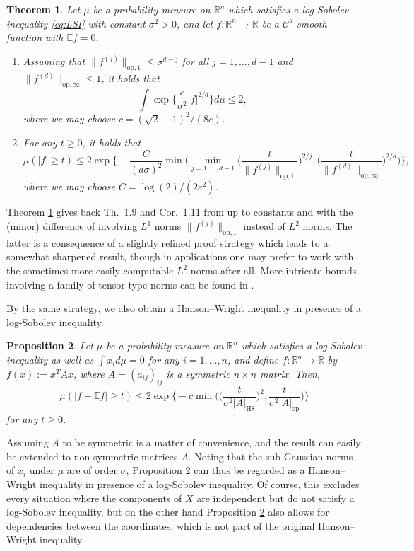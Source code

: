 \documentclass[a4paper,12pt]{amsart}
\numberwithin{equation}{section}
\newtheorem{satz}{Theorem}[section]
\newtheorem{proposition}[satz]{Proposition}
\theoremstyle{remark}
\def\E{{\mathbb E}}
\def\R{{\mathbb R}}
\begin{document}
\begin{satz}\label{thm:HigherOrderLSI}
	Let $\mu$ be a probability measure on $\R^n$ which satisfies a log-Sobolev inequality \eqref{eq:LSI} with constant $\sigma^2 > 0$, and let $f\colon \R^n \to \R$ be a $\mathcal{C}^d$-smooth function with $\E f = 0$.
	\begin{enumerate}
		\item Assuming that $\lVert f^{(j)} \rVert_{\mathrm{op},1} \le \sigma^{d-j}$ for all $j=1,\ldots,d-1$ and $\lVert f^{(d)} \rVert_{\mathrm{op},\infty} \le 1$, it holds that
		\[
		\int \exp\Big\{\frac{c}{\sigma^2} |f|^{2/d} \Big\} d\mu \le 2,
		\]
		where we may choose $c=(\sqrt{2}-1)^2/(8e)$.
		\item For any $t\ge 0$, it holds that
		\[
		\mu(|f| \ge t)\le
		2 \exp\Big\{- \frac{C}{(d\sigma)^2} \min\Big(\min_{j=1, \ldots,d-1} \Big(\frac{t}{\lVert f^{(j)} \rVert_{\mathrm{op},1}}\Big)^{2/j}, \Big(\frac{t}{\lVert f^{(d)} \rVert_{\mathrm{op},\infty}}\Big)^{2/d}\Big)\Big\},
		\]
		where we may choose $C = \log(2)/(2e^2)$.
	\end{enumerate}
\end{satz}

Theorem \ref{thm:HigherOrderLSI} gives back Th.\ 1.9 and Cor.\ 1.11 from \cite{BGS19} up to constants and with the (minor) difference of involving $L^1$ norms $\lVert f^{(j)} \rVert_{\mathrm{op},1}$ instead of $L^2$ norms. The latter is a consequence of a slightly refined proof strategy which leads to a somewhat sharpened result, though in applications one may prefer to work with the sometimes more easily computable $L^2$ norms after all. More intricate bounds involving a family of tensor-type norms can be found in \cite[Th.\ 1.2]{AW15}.

By the same strategy, we also obtain a Hanson--Wright inequality in presence of a log-Sobolev inequality.

\begin{proposition}\label{prop:HWILSU}
    Let $\mu$ be a probability measure on $\R^n$ which satisfies a log-Sobolev inequality as well as $\int x_i d\mu = 0$ for any $i=1, \ldots,n$, and define $f\colon \R^n \to \R$ by $f(x) := x^TAx$, where $A=(a_{ij})_{ij}$ is a symmetric $n \times n$ matrix. Then,
    \[
    \mu(|f - \E f| \ge t) \le 2\exp\Big\{-c \min \Big(\Big(\frac{t}{\sigma^2\lvert A \rvert_{\mathrm{HS}}}\Big)^2, \frac{t}{\sigma^2\lvert A \rvert_{\mathrm{op}}}\Big)\Big\}
    \]
    for any $t \ge 0$.
\end{proposition}

Assuming $A$ to be symmetric is a matter of convenience, and the result can easily be extended to non-symmetric matrices $A$. Noting that the sub-Gaussian norms of $x_i$ under $\mu$ are of order $\sigma$, Proposition \ref{prop:HWILSU} can thus be regarded as a Hanson--Wright inequality in presence of a log-Sobolev inequality. Of course, this excludes every situation where the components of $X$ are independent but do not satisfy a log-Sobolev inequality, but on the other hand Proposition \ref{prop:HWILSU} also allows for dependencies between the coordinates, which is not part of the original Hanson--Wright inequality.
\end{document}
